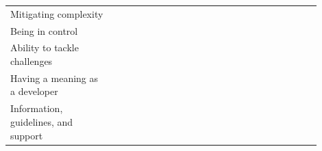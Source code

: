 \documentclass[english, 12pt, a4paper, sci, utf8, a-1b, online]{aaltothesis}
\begin{document}
{\begin{center}
\begin{longtable}{p{0.3\linewidth}p{0.6\linewidth}}
      Mitigating complexity                   & \textcite{fontao2017facing} \newline \textcite{nebeling2013informing} \newline \textcite{miranda2018improving}                                                                                                                                                                                                               \\
      Being in control                        & \textcite{software-developers-as-users} \newline \textcite{silva-comparing} \newline \textcite{myers2016improving} \newline \textcite{macvean2016api}                                                                                                                                                                        \\
      Ability to tackle challenges            & \textcite{pinter2019polymorph} \newline \textcite{ivo2018approach} \newline \textcite{zhang2018toward} \newline \textcite{what-happens-when-unhappy}                                                                                                                                                                         \\
      Having a meaning as a developer         & \textcite{fagerholm2014examining} \newline \textcite{fontao2017investigating}                                                                                                                                                                                                                                                \\
      Information, guidelines, and support    & \textcite{de2017towards} \newline \textcite{myers2016improving} \newline \textcite{macvean2016api} \newline \textcite{claussen2019role} \newline \textcite{chatley2019supporting} \newline \textcite{nazariodetecting} \newline \textcite{henriques2018improving} \newline \textcite{fontao2018mobile}                       \\

\end{longtable}
\end{center}}
\end{document}

